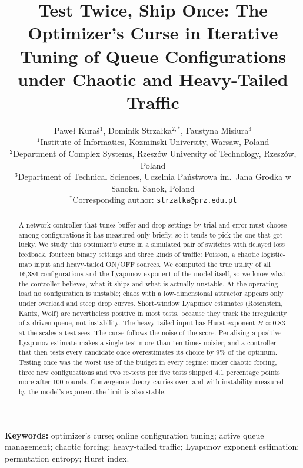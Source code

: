 \documentclass[11pt,a4paper]{article}
\title{\textbf{Test Twice, Ship Once: The Optimizer's Curse in Iterative Tuning of Queue Configurations under Chaotic and Heavy-Tailed Traffic}}
\author{
  Pawe{\l} Kura{\'s}$^{1}$, Dominik Strza{\l}ka$^{2,*}$, Faustyna Misiura$^{3}$\\[1ex]
  \small $^{1}$Institute of Informatics, Kozminski University, Warsaw, Poland\\
  \small $^{2}$Department of Complex Systems, Rzesz{\'o}w University of Technology, Rzesz{\'o}w, Poland\\
  \small $^{3}$Department of Technical Sciences, Uczelnia Pa{\'n}stwowa im.\ Jana Grodka w Sanoku, Sanok, Poland\\[0.5ex]
  \small $^{*}$Corresponding author: \texttt{strzalka@prz.edu.pl}
}
\date{}
\begin{document}
\maketitle

\begin{abstract}
A network controller that tunes buffer and drop settings by trial and error must choose among configurations it has measured only briefly, so it tends to pick the one that got lucky. We study this optimizer's curse in a simulated pair of switches with delayed loss feedback, fourteen binary settings and three kinds of traffic: Poisson, a chaotic logistic-map input and heavy-tailed ON/OFF sources. We computed the true utility of all 16,384 configurations and the Lyapunov exponent of the model itself, so we know what the controller believes, what it ships and what is actually unstable. At the operating load no configuration is unstable; chaos with a low-dimensional attractor appears only under overload and steep drop curves. Short-window Lyapunov estimates (Rosenstein, Kantz, Wolf) are nevertheless positive in most tests, because they track the irregularity of a driven queue, not instability. The heavy-tailed input has Hurst exponent $H\approx0.83$ at the scales a test sees. The curse follows the noise of the score. Penalising a positive Lyapunov estimate makes a single test more than ten times noisier, and a controller that then tests every candidate once overestimates its choice by 9\% of the optimum. Testing once was the worst use of the budget in every regime: under chaotic forcing, three new configurations and two re-tests per five tests shipped 4.1 percentage points more after 100 rounds. Convergence theory carries over, and with instability measured by the model's exponent the limit is also stable.
\end{abstract}

\noindent\textbf{Keywords:} optimizer's curse; online configuration tuning; active queue management; chaotic forcing; heavy-tailed traffic; Lyapunov exponent estimation; permutation entropy; Hurst index.

\vspace{1em}
\noindent{}
\end{document}
